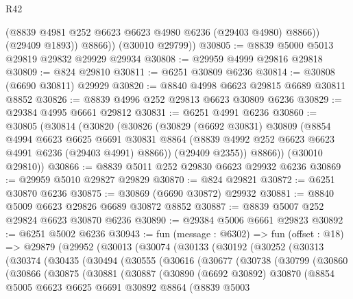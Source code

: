 \begin{lexlean}{R42}
\begin{coremodule}
{              (@8839 @4981 @252 @6623 @6623 @4980 @6236 (@29403 @4980) @8866))
            (@29409 @1893))
          @8866))
      (@30010 @29799))
@30805 := @8839 @5000 @5013 @29819 @29832 @29929 @29934
@30808 := @29959 @4999 @29816 @29818
@30809 := @824 @29810
@30811 := @6251 @30809 @6236
@30814 := @30808 (@6690 @30811) @29929
@30820 := @8840 @4998 @6623 @29815 @6689 @30811 @8852
@30826 := @8839 @4996 @252 @29813 @6623 @30809 @6236
@30829 := @29384 @4995 @6661 @29812
@30831 := @6251 @4991 @6236
@30860 := @30805
    (@30814
      (@30820
        (@30826
          (@30829
            (@6692 @30831)
            @30809
            (@8854
              @4994
              @6623
              @6625
              @6691
              @30831
              @8864
              (@8839 @4992 @252 @6623 @6623 @4991 @6236 (@29403 @4991) @8866))
            (@29409 @2355))
          @8866))
      (@30010 @29810))
@30866 := @8839 @5011 @252 @29830 @6623 @29932 @6236
@30869 := @29959 @5010 @29827 @29829
@30870 := @824 @29821
@30872 := @6251 @30870 @6236
@30875 := @30869 (@6690 @30872) @29932
@30881 := @8840 @5009 @6623 @29826 @6689 @30872 @8852
@30887 := @8839 @5007 @252 @29824 @6623 @30870 @6236
@30890 := @29384 @5006 @6661 @29823
@30892 := @6251 @5002 @6236
@30943 := fun (message : @6302) =>
  fun (offset : @18) =>
  @29879
    (@29952
      (@30013
        (@30074
          (@30133
            (@30192
              (@30252
                (@30313
                  (@30374
                    (@30435
                      (@30494
                        (@30555
                          (@30616
                            (@30677
                              (@30738
                                (@30799
                                  (@30860
                                    (@30866
                                      (@30875
                                        (@30881
                                          (@30887
                                            (@30890
                                              (@6692 @30892)
                                              @30870
                                              (@8854
                                                @5005
                                                @6623
                                                @6625
                                                @6691
                                                @30892
                                                @8864
                                                (@8839
                                                  @5003
}
\end{coremodule}
\end{lexlean}
